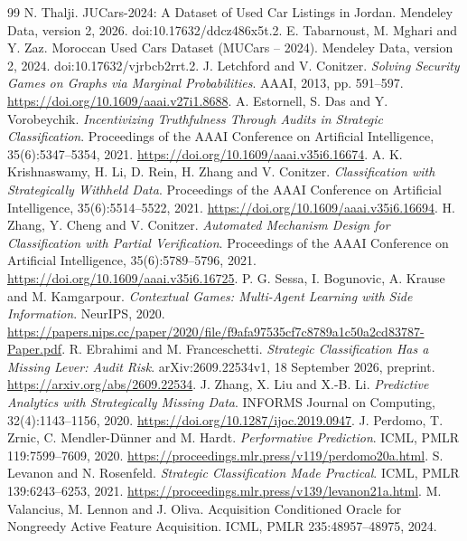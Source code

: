 \documentclass[11pt]{article}
\begin{document}
\begingroup\small
\begin{thebibliography}{99}
 N. Thalji.
JUCars-2024: A Dataset of Used Car Listings in Jordan.
Mendeley Data, version 2, 2026. doi:10.17632/ddcz486x5t.2.
 E. Tabarnoust, M. Mghari and Y. Zaz.
Moroccan Used Cars Dataset (MUCars -- 2024).
Mendeley Data, version 2, 2024. doi:10.17632/vjrbcb2rrt.2.
 J. Letchford and V. Conitzer.
\emph{Solving Security Games on Graphs via Marginal Probabilities}.
AAAI, 2013, pp. 591--597. \url{https://doi.org/10.1609/aaai.v27i1.8688}.
 A. Estornell, S. Das and Y. Vorobeychik.
\emph{Incentivizing Truthfulness Through Audits in Strategic Classification}.
Proceedings of the AAAI Conference on Artificial Intelligence,
35(6):5347--5354, 2021. \url{https://doi.org/10.1609/aaai.v35i6.16674}.
 A. K. Krishnaswamy, H. Li, D. Rein, H. Zhang and V. Conitzer.
\emph{Classification with Strategically Withheld Data}.
Proceedings of the AAAI Conference on Artificial Intelligence,
35(6):5514--5522, 2021. \url{https://doi.org/10.1609/aaai.v35i6.16694}.
 H. Zhang, Y. Cheng and V. Conitzer.
\emph{Automated Mechanism Design for Classification with Partial Verification}.
Proceedings of the AAAI Conference on Artificial Intelligence,
35(6):5789--5796, 2021.
\url{https://doi.org/10.1609/aaai.v35i6.16725}.
 P. G. Sessa, I. Bogunovic, A. Krause and M. Kamgarpour.
\emph{Contextual Games: Multi-Agent Learning with Side Information}.
NeurIPS, 2020.
\url{https://papers.nips.cc/paper/2020/file/f9afa97535cf7c8789a1c50a2cd83787-Paper.pdf}.
 R. Ebrahimi and M. Franceschetti.
\emph{Strategic Classification Has a Missing Lever: Audit Risk}.
arXiv:2609.22534v1, 18 September 2026, preprint.
\url{https://arxiv.org/abs/2609.22534}.
 J. Zhang, X. Liu and X.-B. Li.
\emph{Predictive Analytics with Strategically Missing Data}.
INFORMS Journal on Computing, 32(4):1143--1156, 2020.
\url{https://doi.org/10.1287/ijoc.2019.0947}.
 J. Perdomo, T. Zrnic, C. Mendler-D\"unner and M. Hardt.
\emph{Performative Prediction}. ICML, PMLR 119:7599--7609, 2020.
\url{https://proceedings.mlr.press/v119/perdomo20a.html}.
 S. Levanon and N. Rosenfeld.
\emph{Strategic Classification Made Practical}. ICML, PMLR 139:6243--6253, 2021.
\url{https://proceedings.mlr.press/v139/levanon21a.html}.
 M. Valancius, M. Lennon and J. Oliva.
Acquisition Conditioned Oracle for Nongreedy Active Feature Acquisition.
ICML, PMLR 235:48957--48975, 2024.

\end{thebibliography}
\end{document}
